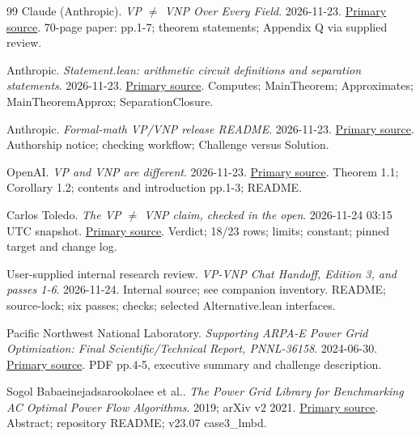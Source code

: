 \documentclass[11pt,letterpaper]{article}
\begin{document}
\clearpage
{}
\begin{thebibliography}{99}
 Claude (Anthropic). \emph{VP $\ne$ VNP Over Every Field}. 2026-11-23. \href{https://github.com/anthropics/formal-math/blob/11b6c7e3c927df2658f513b6b68ea7f8929c62c5/vp-vnp/paper.pdf}{Primary source}. 70-page paper: pp.1-7; theorem statements; Appendix Q via supplied review.

 Anthropic. \emph{Statement.lean: arithmetic circuit definitions and separation statements}. 2026-11-23. \href{https://github.com/anthropics/formal-math/blob/11b6c7e3c927df2658f513b6b68ea7f8929c62c5/vp-vnp/Statement.lean}{Primary source}. Computes; MainTheorem; Approximates; MainTheoremApprox; SeparationClosure.

 Anthropic. \emph{Formal-math VP/VNP release README}. 2026-11-23. \href{https://github.com/anthropics/formal-math/blob/main/vp-vnp/README.md}{Primary source}. Authorship notice; checking workflow; Challenge versus Solution.

 OpenAI. \emph{VP and VNP are different}. 2026-11-23. \href{https://github.com/openai/math/blob/main/preprints/VP-and-VNP-are-different-November-23-2026/paper.pdf}{Primary source}. Theorem 1.1; Corollary 1.2; contents and introduction pp.1-3; README.

 Carlos Toledo. \emph{The VP $\ne$ VNP claim, checked in the open}. 2026-11-24 03:15 UTC snapshot. \href{https://carlostoledo.co/vp-vnp/}{Primary source}. Verdict; 18/23 rows; limits; constant; pinned target and change log.

 User-supplied internal research review. \emph{VP-VNP Chat Handoff, Edition 3, and passes 1-6}. 2026-11-24. Internal source; see companion inventory. README; source-lock; six passes; checks; selected Alternative.lean interfaces.

 Pacific Northwest National Laboratory. \emph{Supporting ARPA-E Power Grid Optimization: Final Scientific/Technical Report, PNNL-36158}. 2024-06-30. \href{https://www.osti.gov/servlets/purl/2404530}{Primary source}. PDF pp.4-5, executive summary and challenge description.

 Sogol Babaeinejadsarookolaee et al.. \emph{The Power Grid Library for Benchmarking AC Optimal Power Flow Algorithms}. 2019; arXiv v2 2021. \href{https://arxiv.org/abs/1908.02788}{Primary source}. Abstract; repository README; v23.07 case3\_lmbd.


\end{thebibliography}
\end{document}
